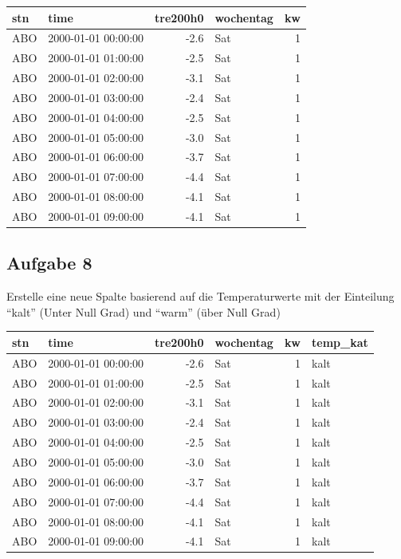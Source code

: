\documentclass[]{book}
\begin{document}
\begin{tabular}{l|l|r|l|r}
\hline
stn & time & tre200h0 & wochentag & kw\\
\hline
ABO & 2000-01-01 00:00:00 & -2.6 & Sat & 1\\
\hline
ABO & 2000-01-01 01:00:00 & -2.5 & Sat & 1\\
\hline
ABO & 2000-01-01 02:00:00 & -3.1 & Sat & 1\\
\hline
ABO & 2000-01-01 03:00:00 & -2.4 & Sat & 1\\
\hline
ABO & 2000-01-01 04:00:00 & -2.5 & Sat & 1\\
\hline
ABO & 2000-01-01 05:00:00 & -3.0 & Sat & 1\\
\hline
ABO & 2000-01-01 06:00:00 & -3.7 & Sat & 1\\
\hline
ABO & 2000-01-01 07:00:00 & -4.4 & Sat & 1\\
\hline
ABO & 2000-01-01 08:00:00 & -4.1 & Sat & 1\\
\hline
ABO & 2000-01-01 09:00:00 & -4.1 & Sat & 1\\
\hline
\end{tabular}

\hypertarget{aufgabe-8}{%
\subsection{Aufgabe 8}\label{aufgabe-8}}

Erstelle eine neue Spalte basierend auf die Temperaturwerte mit der Einteilung ``kalt'' (Unter Null Grad) und ``warm'' (über Null Grad)

\begin{tabular}{l|l|r|l|r|l}
\hline
stn & time & tre200h0 & wochentag & kw & temp\_kat\\
\hline
ABO & 2000-01-01 00:00:00 & -2.6 & Sat & 1 & kalt\\
\hline
ABO & 2000-01-01 01:00:00 & -2.5 & Sat & 1 & kalt\\
\hline
ABO & 2000-01-01 02:00:00 & -3.1 & Sat & 1 & kalt\\
\hline
ABO & 2000-01-01 03:00:00 & -2.4 & Sat & 1 & kalt\\
\hline
ABO & 2000-01-01 04:00:00 & -2.5 & Sat & 1 & kalt\\
\hline
ABO & 2000-01-01 05:00:00 & -3.0 & Sat & 1 & kalt\\
\hline
ABO & 2000-01-01 06:00:00 & -3.7 & Sat & 1 & kalt\\
\hline
ABO & 2000-01-01 07:00:00 & -4.4 & Sat & 1 & kalt\\
\hline
ABO & 2000-01-01 08:00:00 & -4.1 & Sat & 1 & kalt\\
\hline
ABO & 2000-01-01 09:00:00 & -4.1 & Sat & 1 & kalt\\
\hline
\end{tabular}
\end{document}
